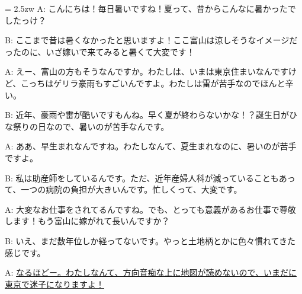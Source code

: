 \documentclass[11pt]{amsart}
\title{}
\author{}
\newenvironment{hangall}[1]{\hangindent = 2.5zw\everypar{\hangindent = 2.5zw}}{}
\begin{document}
\maketitle
\begin{hangall}{}%
A: こんにちは！毎日暑いですね！夏って、昔からこんなに暑かったでしたっけ？

B: ここまで昔は暑くなかったと思いますよ！ここ富山は涼しそうなイメージだったのに、いざ嫁いで来てみると暑くて大変です！

A: えー、富山の方もそうなんですか。わたしは、いまは東京住まいなんですけど、こっちはゲリラ豪雨もすごいんですよ。わたしは雷が苦手なのでほんと辛い。

B: 近年、豪雨や雷が酷いですもんね。早く夏が終わらないかな！？誕生日がひな祭りの日なので、暑いのが苦手なんです。

A: ああ、早生まれなんですね。わたしなんて、夏生まれなのに、暑いのが苦手ですよ。

B: 私は助産師をしているんです。ただ、近年産婦人科が減っていることもあって、一つの病院の負担が大きいんです。忙しくって、大変です。

A: 大変なお仕事をされてるんですね。でも、とっても意義があるお仕事で尊敬します！もう富山に嫁がれて長いんですか？

B: いえ、まだ数年位しか経ってないです。やっと土地柄とかに色々慣れてきた感じです。

A: \ul{なるほどー。わたしなんて、方向音痴な上に地図が読めないので、いまだに東京で迷子になりますよ！}\end{hangall}
\end{document}
